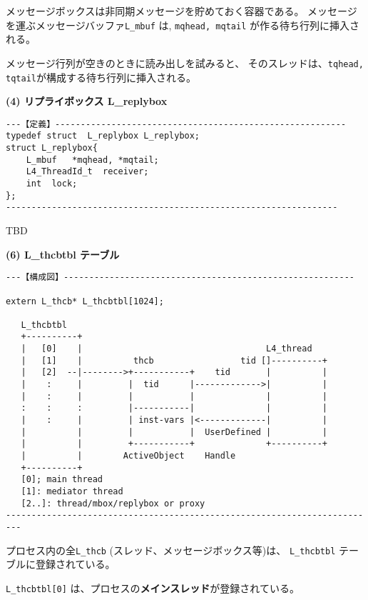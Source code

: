 メッセージボックスは非同期メッセージを貯めておく容器である。
メッセージを運ぶメッセージバッファ\verb|L_mbuf| は,
 \verb|mqhead, mqtail| が作る待ち行列に挿入される。

メッセージ行列が空きのときに読み出しを試みると、
そのスレッドは、\verb|tqhead, tqtail|が構成する待ち行列に挿入される。


{\flushleft\bf (4) リプライボックス L\_replybox}

\begin{verbatim}
---【定義】---------------------------------------------------------
typedef struct  L_replybox L_replybox;
struct L_replybox{
    L_mbuf   *mqhead, *mqtail;
    L4_ThreadId_t  receiver;
    int  lock;
};
-----------------------------------------------------------------
\end{verbatim}

  TBD

\hspace{3cm}





{\flushleft\bf (6) L\_thcbtbl テーブル  }

{\small\begin{verbatim}
---【構成図】---------------------------------------------------------

extern L_thcb* L_thcbtbl[1024];

   L_thcbtbl
   +----------+
   |   [0]    |                                    L4_thread
   |   [1]    |          thcb                 tid []----------+
   |   [2]  --|-------->+-----------+    tid       |          |
   |    :     |         |  tid      |------------->|          |
   |    :     |         |           |              |          |
   :    :     :         |-----------|              |          |
   |    :     |         | inst-vars |<-------------|          |
   |          |         |           |  UserDefined |          |
   |          |         +-----------+              +----------+
   |          |        ActiveObject    Handle      
   +----------+
   [0]; main thread
   [1]: mediator thread
   [2..]: thread/mbox/replybox or proxy
-------------------------------------------------------------------------

\end{verbatim}}

プロセス内の全\verb|L_thcb| (スレッド、メッセージボックス等)は、
\verb|L_thcbtbl| テーブルに登録されている。

\verb|L_thcbtbl[0]| は、プロセスの{\bf メインスレッド}が登録されている。

